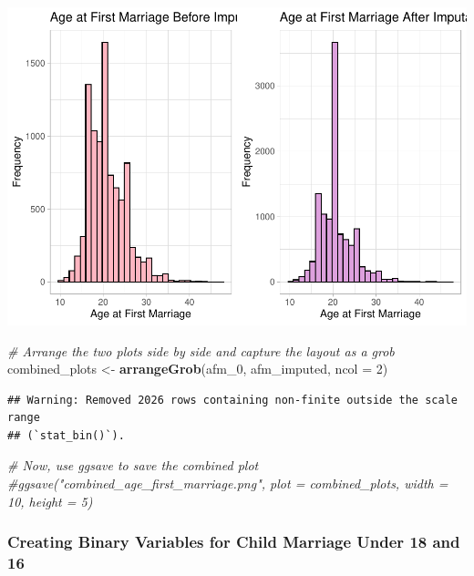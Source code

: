 \documentclass[
]{article}
\newenvironment{Shaded}{\begin{snugshade}}{\end{snugshade}}
\newcommand{\AttributeTok}[1]{\textcolor[rgb]{0.13,0.29,0.53}{#1}}
\newcommand{\CommentTok}[1]{\textcolor[rgb]{0.56,0.35,0.01}{\textit{#1}}}
\newcommand{\DecValTok}[1]{\textcolor[rgb]{0.00,0.00,0.81}{#1}}
\newcommand{\FunctionTok}[1]{\textcolor[rgb]{0.13,0.29,0.53}{\textbf{#1}}}
\newcommand{\NormalTok}[1]{#1}
\newcommand{\OtherTok}[1]{\textcolor[rgb]{0.56,0.35,0.01}{#1}}
\begin{document}
\includegraphics{ChildMarriage_files/figure-latex/unnamed-chunk-23-1.pdf}

\begin{Shaded}
\begin{Highlighting}[]
\CommentTok{\# Arrange the two plots side by side and capture the layout as a grob}
\NormalTok{combined\_plots }\OtherTok{\textless{}{-}} \FunctionTok{arrangeGrob}\NormalTok{(afm\_0, afm\_imputed, }\AttributeTok{ncol =} \DecValTok{2}\NormalTok{)}
\end{Highlighting}
\end{Shaded}

\begin{verbatim}
## Warning: Removed 2026 rows containing non-finite outside the scale range
## (`stat_bin()`).
\end{verbatim}

\begin{Shaded}
\begin{Highlighting}[]
\CommentTok{\# Now, use ggsave to save the combined plot}
\CommentTok{\#ggsave("combined\_age\_first\_marriage.png", plot = combined\_plots, width = 10, height = 5)}
\end{Highlighting}
\end{Shaded}

\hypertarget{creating-binary-variables-for-child-marriage-under-18-and-16}{%
\subsubsection{Creating Binary Variables for Child Marriage Under 18 and
16}\label{creating-binary-variables-for-child-marriage-under-18-and-16}}
\end{document}
